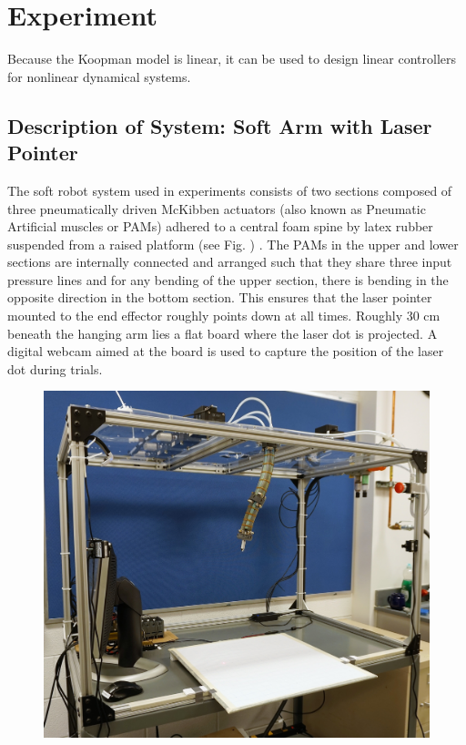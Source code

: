 \section{Experiment}
\label{sec:methods}

Because the Koopman model is linear, it can be used to design linear controllers for nonlinear dynamical systems.


\subsection{Description of System: Soft Arm with Laser Pointer}

The soft robot system used in experiments consists of two sections composed of three pneumatically driven McKibben actuators (also known as Pneumatic Artificial muscles or PAMs) adhered to a central foam spine by latex rubber suspended from a raised platform (see Fig. ) .
The PAMs in the upper and lower sections are internally connected and arranged such that they share three input pressure lines and for any bending of the upper section, there is bending in the opposite direction in the bottom section.
This ensures that the laser pointer mounted to the end effector roughly points down at all times.
Roughly 30 cm beneath the hanging arm lies a flat board where the laser dot is projected.
A digital webcam aimed at the board is used to capture the position of the laser dot during trials.

\begin{figure}
    \centering
    \includegraphics[width=\linewidth]{figures/DSC00707_cropped.jpg}
    \caption{}
    \label{fig:rig}
\end{figure}

